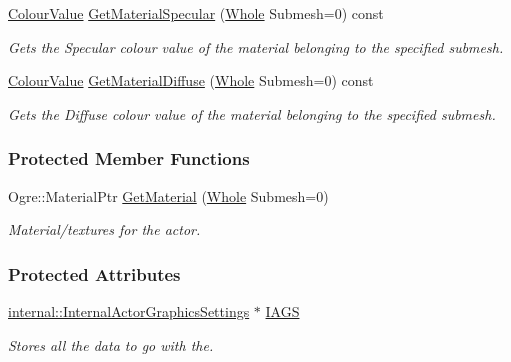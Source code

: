 \begin{DoxyCompactItemize}
\hyperlink{classphys_1_1ColourValue}{ColourValue} \hyperlink{classphys_1_1ActorGraphicsSettings_a2598d7db0dd899417aa3e4d017b8c6ab}{GetMaterialSpecular} (\hyperlink{namespacephys_a460f6bc24c8dd347b05e0366ae34f34a}{Whole} Submesh=0) const 
\begin{DoxyCompactList}\small\item\em Gets the Specular colour value of the material belonging to the specified submesh. \item\end{DoxyCompactList}\item 
\hyperlink{classphys_1_1ColourValue}{ColourValue} \hyperlink{classphys_1_1ActorGraphicsSettings_ab4b2a4938c6fb0c400882fb929bc7133}{GetMaterialDiffuse} (\hyperlink{namespacephys_a460f6bc24c8dd347b05e0366ae34f34a}{Whole} Submesh=0) const 
\begin{DoxyCompactList}\small\item\em Gets the Diffuse colour value of the material belonging to the specified submesh. \item\end{DoxyCompactList}\end{DoxyCompactItemize}
\subsubsection*{Protected Member Functions}
\begin{DoxyCompactItemize}
\item 
\hypertarget{classphys_1_1ActorGraphicsSettings_ade1b760cc01187e9ffdeed8871533066}{
Ogre::MaterialPtr \hyperlink{classphys_1_1ActorGraphicsSettings_ade1b760cc01187e9ffdeed8871533066}{GetMaterial} (\hyperlink{namespacephys_a460f6bc24c8dd347b05e0366ae34f34a}{Whole} Submesh=0)}
\label{classphys_1_1ActorGraphicsSettings_ade1b760cc01187e9ffdeed8871533066}

\begin{DoxyCompactList}\small\item\em Material/textures for the actor. \item\end{DoxyCompactList}\end{DoxyCompactItemize}
\subsubsection*{Protected Attributes}
\begin{DoxyCompactItemize}
\item 
\hypertarget{classphys_1_1ActorGraphicsSettings_afc038a8da65483f028f799fb80f62848}{
\hyperlink{classphys_1_1internal_1_1InternalActorGraphicsSettings}{internal::InternalActorGraphicsSettings} $\ast$ \hyperlink{classphys_1_1ActorGraphicsSettings_afc038a8da65483f028f799fb80f62848}{IAGS}}
\label{classphys_1_1ActorGraphicsSettings_afc038a8da65483f028f799fb80f62848}

\begin{DoxyCompactList}\small\item\em Stores all the data to go with the. \item\end{DoxyCompactList}\end{DoxyCompactItemize}



